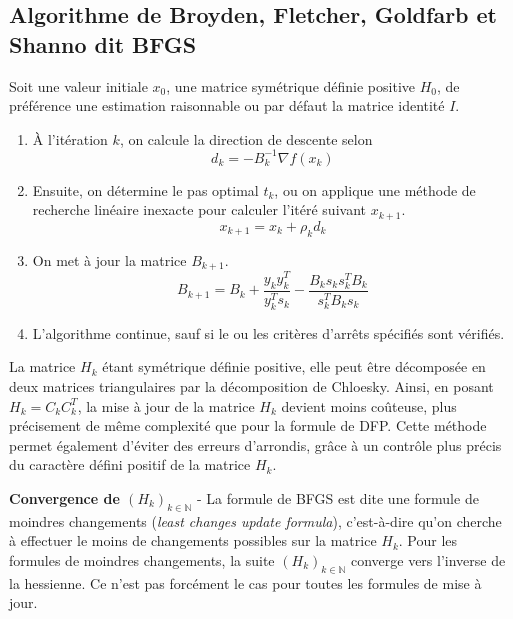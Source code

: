 \documentclass[3p, twocolumn]{elsarticle}
\begin{document}
\subsection{Algorithme de Broyden, Fletcher, Goldfarb et Shanno dit BFGS}
Soit une valeur initiale $x_0$, une matrice symétrique définie positive $H_0$, de préférence une estimation raisonnable ou par défaut la matrice identité $I$. 
\begin{enumerate}
    \item \`A l'itération $k$, on calcule la direction de descente selon
    \begin{equation*}
        d_{k}=-B_{k}^{-1}\nabla f(x_{k})
    \end{equation*}
    \item Ensuite, on détermine le pas optimal $t_k$, ou on applique une méthode de recherche linéaire inexacte pour calculer l'itéré suivant $x_{k+1}$.
    \begin{equation*}
        x_{k+1}=x_{k}+\rho_{k}d_{k}
    \end{equation*}
    \item On met à jour la matrice $B_{k+1}$.
    \begin{equation*}
        B_{k+1} = B_k + \frac{y_ky_k^T}{y_k^Ts_k}-\frac{B_ks_ks_k^TB_k}{s_k^TB_ks_k}
    \end{equation*}
    \item L'algorithme continue, sauf si le ou les critères d'arrêts spécifiés sont vérifiés.
\end{enumerate}

La matrice $H_{k}$ étant symétrique définie positive, elle peut être décomposée en deux matrices triangulaires par la décomposition de Chloesky. Ainsi, en posant $H_{k}=C_{k}C_{k}^{T}$, la mise à jour de la matrice $H_{k}$ devient moins coûteuse, plus précisement de même complexité que pour la formule de DFP. Cette méthode permet également d'éviter des erreurs d'arrondis, grâce à un contrôle plus précis du caractère défini positif de la matrice $H_{k}$.

\begin{rmk}
    \textbf{Convergence de $(H_k)_{k\in \mathbb{N}}$} - La formule de BFGS est dite une formule de moindres changements (\textit{least changes update formula}), c'est-à-dire qu'on cherche à effectuer le moins de changements possibles sur la matrice $H_k$. Pour les formules de moindres changements, la suite $(H_k)_{k\in \mathbb{N}}$ converge vers l'inverse de la hessienne. Ce n'est pas forcément le cas pour toutes les formules de mise à jour. 
\end{rmk}
\end{document}
